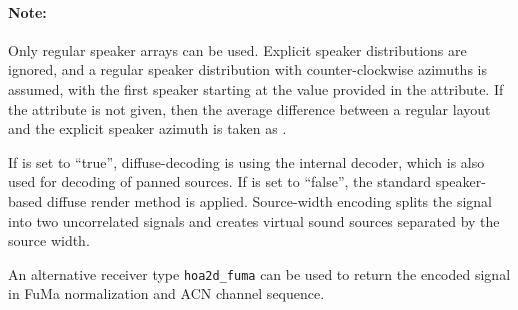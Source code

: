 \paragraph{Note:}
Only regular speaker arrays can be used. Explicit speaker
distributions are ignored, and a regular speaker distribution with
counter-clockwise azimuths is assumed, with the first speaker starting
at the value provided in the  attribute.
%
If the  attribute is not given, then the average
difference between a regular layout and the explicit speaker azimuth
is taken as .

If  is set to ``true'', diffuse-decoding is using the
internal decoder, which is also used for decoding of panned sources.
%
If  is set to ``false'', the standard speaker-based
diffuse render method is applied.
%
Source-width encoding splits the signal into two uncorrelated signals
and creates virtual sound sources separated by the source width.

An alternative receiver type \verb!hoa2d_fuma! can be used to return
the encoded signal in FuMa normalization and ACN channel sequence.
